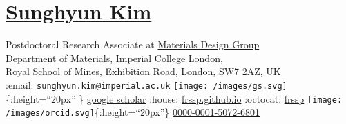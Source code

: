 \section{\texorpdfstring{\href{pdf/cv.pdf}{Sunghyun
Kim}}{Sunghyun Kim}}\label{sunghyun-kim}

Postdoctoral Research Associate at
\href{https://wmd-group.github.io}{Materials Design Group}\\
Department of Materials, Imperial College London,\\
Royal School of Mines, Exhibition Road, London, SW7 2AZ, UK\\
:email:
\href{mailto:sunghyun.kim@imperial.ac.uk}{\nolinkurl{sunghyun.kim@imperial.ac.uk}}
\textbar{} \texttt{[image: /images/gs.svg]}\{:height=``20px'' \}
\href{https://scholar.google.co.uk/citations?user=v438vEAAAAAJ}{google
scholar} \textbar{} :house:
\href{https://frssp.github.io}{frssp.github.io} \textbar{} :octocat:
\href{https://github.com/frssp}{frssp} \textbar{}
\texttt{[image: /images/orcid.svg]}\{:height=``20px''\}
\href{https://orcid.org/0000-0001-5072-6801}{0000-0001-5072-6801}
